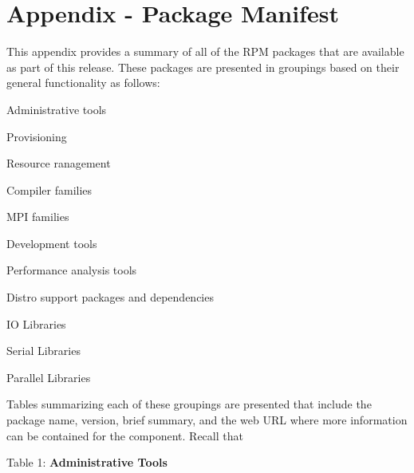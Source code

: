 \clearpage

\appendix
\section*{Appendix - Package Manifest}
\renewcommand{\thesubsection}{\Alph{subsection}}


This appendix provides a summary of all of the RPM packages that are available
as part of this \FSP{} release. These packages are presented in groupings
based on their general functionality as follows:

\begin{itemize*}
\item Administrative tools
\item Provisioning
\item Resource ranagement
\item Compiler families
\item MPI families
\item Development tools
\item Performance analysis tools
\item Distro support packages and dependencies
\item IO Libraries
\item Serial Libraries
\item Parallel Libraries
\end{itemize*}

Tables summarizing each of these groupings are presented that include
the package name, version, brief summary, and the web URL where more information
can be contained for the component. Recall that 



\newcommand{\firstColWidth}{3.5cm}
\newcommand{\secondColWidth}{1.5cm}


\newpage
\begin{table}[h!]

\end{table}
\vspace*{-0.2cm}
\noindent Table 1: {\bf Administrative Tools} \vspace*{0.3cm}

